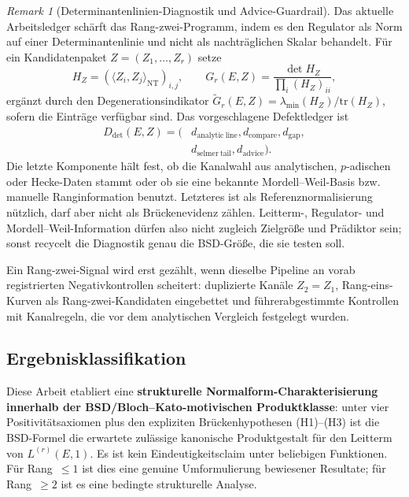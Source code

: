 \documentclass[aps,prd,twocolumn,superscriptaddress,nofootinbib,floatfix]{revtex4-2}
\theoremstyle{definition}
\theoremstyle{remark}
\newtheorem{remark}[theorem]{Remark}
\begin{document}
\begin{remark}[Determinantenlinien-Diagnostik und Advice-Guardrail]
\label{rem:det-line-diagnostic}
Das aktuelle Arbeitsledger schärft das Rang-zwei-Programm, indem es den
Regulator als Norm auf einer Determinantenlinie und nicht als nachträglichen
Skalar behandelt. Für ein Kandidatenpaket $Z=(Z_1,\ldots,Z_r)$ setze
\[
H_Z=(\langle Z_i,Z_j\rangle_{\mathrm{NT}})_{i,j},\qquad
G_r(E,Z)=\frac{\det H_Z}{\prod_i (H_Z)_{ii}},
\]
ergänzt durch den Degenerationsindikator
$\widetilde G_r(E,Z)=\lambda_{\min}(H_Z)/\mathrm{tr}(H_Z)$, sofern die
Einträge verfügbar sind. Das vorgeschlagene Defektledger ist
\[
\begin{aligned}
D_{\det}(E,Z)=(&d_{\mathrm{analytic\ line}},d_{\mathrm{compare}},d_{\mathrm{gap}},\\
&d_{\mathrm{selmer\ tail}},d_{\mathrm{advice}}).
\end{aligned}
\]
Die letzte Komponente hält fest, ob die Kanalwahl aus analytischen,
$p$-adischen oder Hecke-Daten stammt oder ob sie eine bekannte
Mordell--Weil-Basis bzw. manuelle Ranginformation benutzt. Letzteres ist als
Referenznormalisierung nützlich, darf aber nicht als Brückenevidenz zählen.
Leitterm-, Regulator- und Mordell--Weil-Information dürfen also nicht
zugleich Zielgröße und Prädiktor sein; sonst recycelt die Diagnostik genau
die BSD-Größe, die sie testen soll.

Ein Rang-zwei-Signal wird erst gezählt, wenn dieselbe Pipeline an
vorab registrierten Negativkontrollen scheitert: duplizierte Kanäle
$Z_2=Z_1$, Rang-eins-Kurven als Rang-zwei-Kandidaten eingebettet und
führerabgestimmte Kontrollen mit Kanalregeln, die vor dem analytischen
Vergleich festgelegt wurden.
\end{remark}

\subsection*{Ergebnisklassifikation}

Diese Arbeit etabliert eine \textbf{strukturelle Normalform-Charakterisierung innerhalb der BSD/Bloch--Kato-motivischen Produktklasse}: unter vier Positivitätsaxiomen plus den expliziten Brückenhypothesen (H1)--(H3) ist die BSD-Formel die erwartete zulässige kanonische Produktgestalt für den Leitterm von $L^{(r)}(E,1)$. Es ist kein Eindeutigkeitsclaim unter beliebigen Funktionen. Für Rang~$\leq 1$ ist dies eine genuine Umformulierung bewiesener Resultate; für Rang~$\geq 2$ ist es eine bedingte strukturelle Analyse.
\end{document}
